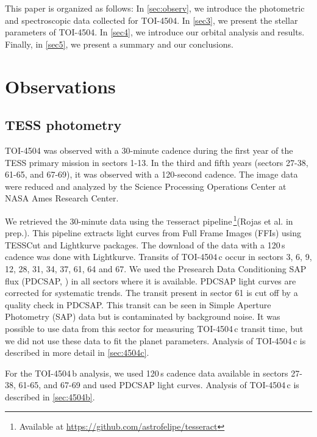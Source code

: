 \documentclass[twocolumn,twocolappendix]{aastex631}
\let\orgautoref\autoref
\renewcommand{\autoref}
        {\def\equationautorefname{Eq.}%
         \def\figureautorefname{Fig.}%
         \def\sectionautorefname{Sect.}%
         \def\subsectionautorefname{Sect.}%
         \def\subsubsectionautorefname{Sect.}%
         \orgautoref}
\begin{document}
This paper is organized as follows: In \autoref{sec:observ}, we introduce the photometric and spectroscopic data collected for TOI-4504. In \autoref{sec3}, we present the stellar parameters 
of TOI-4504. In \autoref{sec4}, we introduce our orbital analysis and results. Finally, in \autoref{sec5}, we present a summary and our conclusions.

  


\section{Observations} 
\label{sec:observ}

\subsection{TESS photometry}
\label{sec:photo}
TOI-4504 was observed with a 30-minute cadence during the first year of the TESS primary mission in sectors 1-13. In the third and fifth years (sectors 27-38, 61-65, and 67-69), it was observed with a 120-second cadence. The image data were reduced and analyzed by the Science Processing Operations Center at NASA Ames Research Center.

We retrieved the 30-minute data using the {\textsc tesseract} pipeline\,\footnote{Available at \url{https://github.com/astrofelipe/tesseract}}(Rojas et al. in prep.). This pipeline extracts light curves from Full Frame Images (FFIs) using {\textsc TESSCut} \citep{tesscut} and {\textsc Lightkurve} \citep{lightkurve} packages. The download of the data with a 120\,s cadence was done with {\textsc Lightkurve}. Transits of TOI-4504\,c occur in sectors 3, 6, 9, 12, 28, 31, 34, 37, 61, 64 and 67. We used the Presearch Data Conditioning SAP flux (PDCSAP, \citealt{pdcsap1,pdcsap2,pdcsap3}) in all sectors where it is available. PDCSAP light curves are corrected for systematic trends. The transit present in sector 61 is cut off by a quality check in PDCSAP. This transit can be seen in Simple Aperture Photometry (SAP) data but is contaminated by background noise. It was possible to use data from this sector for measuring TOI-4504\,c transit time, but we did not use these data to fit the planet parameters. Analysis of TOI-4504\,c is described in more detail in \autoref{sec:4504c}.

For the TOI-4504\,b analysis, we used 120\,s cadence data available in sectors 27-38, 61-65, and 67-69 and used PDCSAP light curves. Analysis of TOI-4504\,c is described in \autoref{sec:4504b}. 
\end{document}
